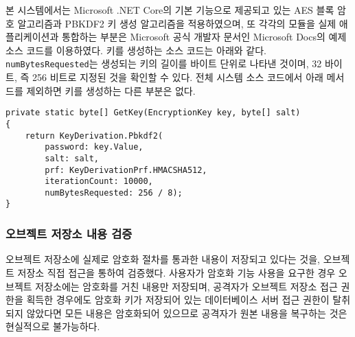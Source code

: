 \documentclass[11pt,oneside,openany,itemph,a4paper,chapter]{oblivoir}
\begin{document}
본 시스템에서는 Microsoft .NET Core의 기본 기능으로 제공되고 있는 AES 블록 암호 알고리즘과 PBKDF2 키 생성 알고리즘을 적용하였으며, 또 각각의 모듈을 실제 애플리케이션과 통합하는 부분은 Microsoft 공식 개발자 문서인 Microsoft Docs의 예제 소스 코드를 이용하였다. 키를 생성하는 소스 코드는 아래와 같다. \texttt{numBytesRequested}는 생성되는 키의 길이를 바이트 단위로 나타낸 것이며, 32 바이트, 즉 256 비트로 지정된 것을 확인할 수 있다. 전체 시스템 소스 코드에서 아래 메서드를 제외하면 키를 생성하는 다른 부분은 없다.

\begin{verbatim}
private static byte[] GetKey(EncryptionKey key, byte[] salt)
{
    return KeyDerivation.Pbkdf2(
        password: key.Value,
        salt: salt,
        prf: KeyDerivationPrf.HMACSHA512,
        iterationCount: 10000,
        numBytesRequested: 256 / 8);
}
\end{verbatim}

\subsubsection{오브젝트 저장소 내용 검증}
오브젝트 저장소에 실제로 암호화 절차를 통과한 내용이 저장되고 있다는 것을, 오브젝트 저장소 직접 접근을 통하여 검증했다. 사용자가 암호화 기능 사용을 요구한 경우 오브젝트 저장소에는 암호화를 거친 내용만 저장되며, 공격자가 오브젝트 저장소 접근 권한을 획득한 경우에도 암호화 키가 저장되어 있는 데이터베이스 서버 접근 권한이 탈취되지 않았다면 모든 내용은 암호화되어 있으므로 공격자가 원본 내용을 복구하는 것은 현실적으로 불가능하다.


\end{document}

